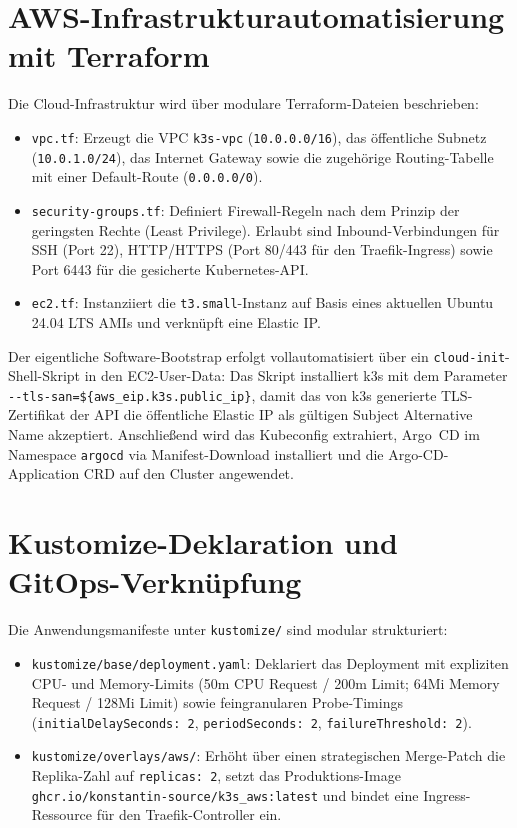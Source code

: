 \section{AWS-Infrastrukturautomatisierung mit Terraform}
\label{sec:terraform-k3s-bootstrap}
Die Cloud-Infrastruktur wird über modulare Terraform-Dateien beschrieben:
\begin{itemize}
    \item \texttt{vpc.tf}: Erzeugt die VPC \texttt{k3s-vpc} (\texttt{10.0.0.0/16}), das öffentliche Subnetz (\texttt{10.0.1.0/24}), das Internet Gateway sowie die zugehörige Routing-Tabelle mit einer Default-Route (\texttt{0.0.0.0/0}).
    \item \texttt{security-groups.tf}: Definiert Firewall-Regeln nach dem Prinzip der geringsten Rechte (Least Privilege). Erlaubt sind Inbound-Verbindungen für SSH (Port 22), HTTP/HTTPS (Port 80/443 für den Traefik-Ingress) sowie Port 6443 für die gesicherte Kubernetes-API.
    \item \texttt{ec2.tf}: Instanziiert die \texttt{t3.small}-Instanz auf Basis eines aktuellen Ubuntu 24.04 LTS AMIs und verknüpft eine Elastic IP.
\end{itemize}

Der eigentliche Software-Bootstrap erfolgt vollautomatisiert über ein \texttt{cloud-init}-Shell-Skript in den EC2-User-Data:
Das Skript installiert k3s mit dem Parameter \texttt{-{}-tls-san=\allowbreak\$\{aws\_eip.\allowbreak k3s.\allowbreak public\_ip\}}, damit das von k3s generierte TLS-Zertifikat der API die öffentliche Elastic IP als gültigen Subject Alternative Name akzeptiert. Anschließend wird das Kubeconfig extrahiert, Argo~CD im Namespace \texttt{argocd} via Manifest-Download installiert und die Argo-CD-Application CRD auf den Cluster angewendet.

\section{Kustomize-Deklaration und GitOps-Verknüpfung}
\label{sec:kustomize-manifeste}
Die Anwendungsmanifeste unter \texttt{kustomize/} sind modular strukturiert:
\begin{itemize}
    \item \texttt{kustomize/base/deployment.yaml}: Deklariert das Deployment mit expliziten CPU- und Memory-Limits (50m CPU Request / 200m Limit; 64Mi Memory Request / 128Mi Limit) sowie feingranularen Probe-Timings (\texttt{initialDelaySeconds:\allowbreak{} 2}, \texttt{periodSeconds:\allowbreak{} 2}, \texttt{failureThreshold:\allowbreak{} 2}).
    \item \texttt{kustomize/overlays/aws/}: Erhöht über einen strategischen Merge-Patch die Replika-Zahl auf \texttt{replicas: 2}, setzt das Produktions-Image \texttt{ghcr.io/\allowbreak{}konstantin-source/\allowbreak{}k3s\_aws:latest} und bindet eine Ingress-Ressource für den Traefik-Controller ein.
\end{itemize}


